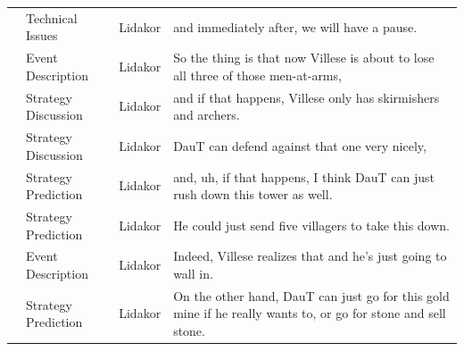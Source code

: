 {\begin{longtable}{@{}>{\theAppRow}r|L{2.3cm}L{1.0cm}U{11.55cm}@{}}
    & Technical Issues      & Lidakor & and immediately after, we will have a pause.                                                                                                                                                                                                                                                    \\
    & Event Description     & Lidakor & So the thing is that now Villese is about to lose all three of those men-at-arms,                                                                                                                                                                                                               \\
    & Strategy Discussion   & Lidakor & and if that happens, Villese only has skirmishers and archers.                                                                                                                                                                                                                                  \\
    & Strategy Discussion   & Lidakor & DauT can defend against that one very nicely,                                                                                                                                                                                                                                                   \\
    & Strategy Prediction   & Lidakor & and, uh, if that happens, I think DauT can just rush down this tower as well.                                                                                                                                                                                                                   \\
    & Strategy Prediction   & Lidakor & He could just send five villagers to take this down.                                                                                                                                                                                                                                            \\
    & Event Description     & Lidakor & Indeed, Villese realizes that and he's just going to wall in.                                                                                                                                                                                                                                   \\
    & Strategy Prediction   & Lidakor & On the other hand, DauT can just go for this gold mine if he really wants to, or go for stone and sell stone.                                                                                                                                                                                   \\

\end{longtable}}
